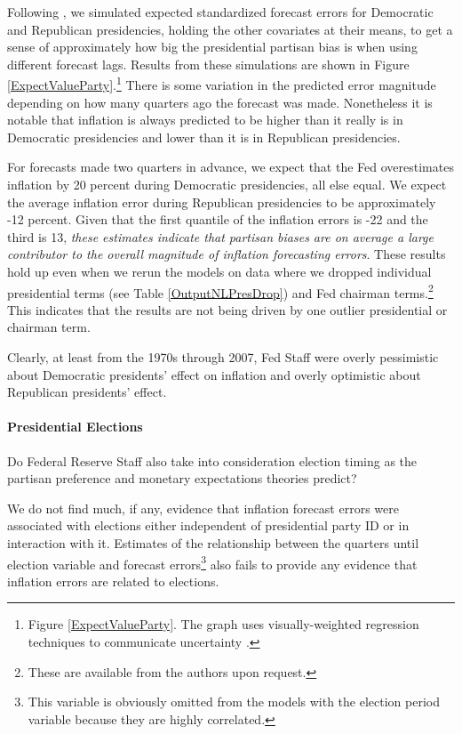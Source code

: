 \documentclass[a4paper]{article}
\begin{document}
Following \cite{King2000}, we simulated expected standardized forecast errors for Democratic and Republican presidencies, holding the other covariates at their means, to get a sense of approximately how big the presidential partisan bias is when using different forecast lags. Results from these simulations are shown in Figure \ref{ExpectValueParty}.\footnote{Figure \ref{ExpectValueParty}. The graph uses visually-weighted regression techniques to communicate uncertainty \citep[see][]{Hsiang2012,Gandrud2013visual}.} There is some variation in the predicted error magnitude depending on how many quarters ago the forecast was made. Nonetheless it is notable that inflation is always predicted to be higher than it really is in Democratic presidencies and lower than it is in Republican presidencies.

For forecasts made two quarters in advance, we expect that the Fed overestimates inflation by 20 percent during Democratic presidencies, all else equal. We expect the average inflation error during Republican presidencies to be approximately -12 percent. Given that the first quantile of the inflation errors is -22 and the third is 13, \emph{these estimates indicate that partisan biases are on average a large contributor to the overall magnitude of inflation forecasting errors}. These results hold up even when we rerun the models on data where we dropped individual presidential terms (see Table \ref{OutputNLPresDrop}) and Fed chairman terms.\footnote{These are available from the authors upon request.} This indicates that the results are not being driven by one outlier presidential or chairman term.

Clearly, at least from the 1970s through 2007, Fed Staff were overly pessimistic about Democratic presidents' effect on inflation and overly optimistic about Republican presidents' effect. 

\paragraph{Presidential Elections}

Do Federal Reserve Staff also take into consideration election timing as the partisan preference and monetary expectations theories predict? 

We do not find much, if any, evidence that inflation forecast errors were associated with elections either independent of presidential party ID or in interaction with it. Estimates of the relationship between the quarters until election variable and forecast errors\footnote{This variable is obviously omitted from the models with the election period variable because they are highly correlated.} also fails to provide any evidence that inflation errors are related to elections. 
\end{document}
